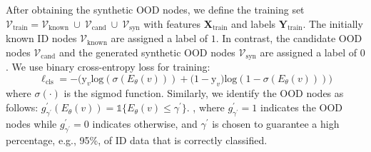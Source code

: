 After obtaining the synthetic OOD nodes, we define the training set $\mathcal{V}_{\mathrm{train}} = \mathcal{V}_{\text{known}} \  \cup \  \mathcal{V}_{\mathrm{cand}} \  \cup  \  \mathcal{V}_{\mathrm{syn}}$ with features $\boldsymbol{X}_{\mathrm{train}}$ and labels $\boldsymbol{Y}_{\mathrm{train}}$. The initially known ID nodes $\mathcal{V}_{\mathrm{known}}$ are assigned a label of $1$. In contrast, the candidate OOD nodes $\mathcal{V}_{\mathrm{cand}}$ and the generated synthetic OOD nodes $\mathcal{V}_{\mathrm{syn}}$ are assigned a label of $0$. We use binary cross-entropy loss for training: 
\begin{equation}
    \ell_{\text{cls}} = - \big ( {\mathrm{y}}_{v}\mathrm{log}(\sigma(E_{\theta}(v)))
    + {(1-\mathrm{y}}_{v})\mathrm{log}(1-\sigma(E_{\theta}(v))) \big )
\end{equation}
where $\sigma(\cdot)$ is the sigmod function. Similarly, we identify the OOD nodes as follows: $ g^{\prime}_{\gamma^{\prime}}(E_{\theta}(v))= \mathds{1}\{E_{\theta}(v) \leq \gamma^{\prime}\}$.
, where $g^{\prime}_{\gamma^{\prime}}=1$ indicates the OOD nodes while $g^{\prime}_{\gamma^{\prime}}=0$ indicates otherwise, and $\gamma^{\prime}$ is chosen to guarantee a high percentage, e.g., 95\%,  of ID data that is correctly classified.



















